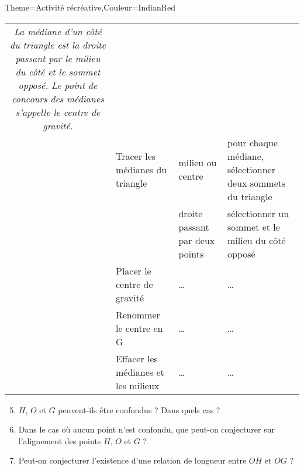 \begin{Maquette}[Cours]{Theme={Activité récréative},Couleur={IndianRed}}
{\begin{tabular}{|cp{5.5cm}|p{4.5cm}|p{5cm}|}
{            {\it La médiane d'un côté du triangle est la droite passant par le milieu du côté et le sommet opposé. \newline
            Le point de concours des médianes s'appelle le centre de gravité.}} \\
            & Tracer les médianes du triangle  &  milieu ou centre & pour chaque médiane, sélectionner deux sommets du triangle \\
            & & droite passant par deux points & sélectionner un sommet et le milieu du côté opposé \\
            & Placer le centre de gravité & \dots & \dots \\
            & Renommer le centre en G & \dots & \dots \\
            & Effacer les médianes et les milieux & \dots & \dots \\
            \hline
         \end{tabular}}
      
         \begin{enumerate}
            \setcounter{enumi}{4}
            \item $H$, $O$ et $G$ peuvent-ils être confondus ? Dans quels cas ? \par \medskip
               \pointilles
            \item Dans le cas où aucun point n'est confondu, que peut-on conjecturer sur l'alignement des points $H$, $O$ et $G$ ? \par \medskip
               \pointilles
            \item Peut-on conjecturer l'existence d'une relation de longueur entre $OH$ et $OG$ ? \par \medskip
               \pointilles
         \end{enumerate} 

\end{Maquette}